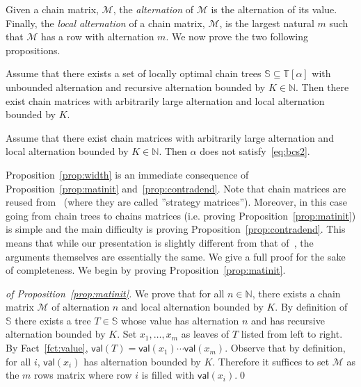 \documentclass[envcountsame]{llncs}
\newcommand\nat{\ensuremath{\mathbb{N}}\xspace}
\newcommand\ct{\ensuremath{\mathbb{T}}\xspace}
\newcommand\cs{\ensuremath{\mathbb{S}}\xspace}
\newcommand\mat{\ensuremath{\mathscr{M}}\xspace}
\newcommand\val[1]{\ensuremath{\textsf{val}(#1)\xspace}}
\newcommand\chain{chain\xspace}
\newcommand\chains{chains\xspace}
\begin{document}
Given a \chain matrix, \mat, the \emph{alternation} of \mat is the
alternation of its value. Finally, the \emph{local alternation} of a
\chain matrix, \mat, is the largest natural $m$ such that \mat has a
row with alternation $m$. We now prove the two following propositions.

\begin{proposition} \label{prop:matinit}
  Assume that there exists a set of locally optimal \chain trees $\cs
  \subseteq \ct[\alpha]$ with unbounded alternation and recursive
  alternation bounded by $K \in \nat$. Then there exist \chain
  matrices with arbitrarily large alternation and local alternation
  bounded by $K$.   
\end{proposition}

\begin{proposition} \label{prop:contradend}
  Assume that there exist \chain matrices with arbitrarily large alternation
  and local alternation bounded by $K\in \nat$. Then $\alpha$ does not
  satisfy~\eqref{eq:bcs2}. 
\end{proposition}

Proposition~\ref{prop:width} is an immediate consequence of
Proposition~\ref{prop:matinit} and~\ref{prop:contradend}. Note that
\chain matrices are reused from~\cite{bpopen} (where they are called
''strategy matrices''). Moreover, in this case going from \chain trees
to \chains matrices (i.e. proving Proposition~\ref{prop:matinit}) is
simple and the main difficulty is proving
Proposition~\ref{prop:contradend}. This means that while our presentation
is slightly different from that of~\cite{bpopen}, the arguments
themselves are essentially the same. We give a full proof for
the sake of completeness. We begin by proving Proposition~\ref{prop:matinit}.

\begin{proof}[of Proposition~\ref{prop:matinit}]
  We prove that for all $n \in \nat$, there exists a \chain matrix \mat
  of alternation $n$ and local alternation bounded by $K$. By definition
  of $\cs$ there exists a tree $T \in \cs$ whose value has alternation
  $n$ and has recursive alternation bounded by $K$. Set $x_1,\dots,x_m$
  as leaves of $T$ listed from left to right. 
  By Fact~\ref{fct:value}, $\val{T} = \val{x_1} \cdots
  \val{x_m}$. Observe that by definition, for all $i$, $\val{x_i}$ has
  alternation bounded by $K$. Therefore it suffices to set \mat as the
  $m$ rows matrix where row $i$ is filled with $\val{x_i}$.\qed
\end{proof}
\end{document}
